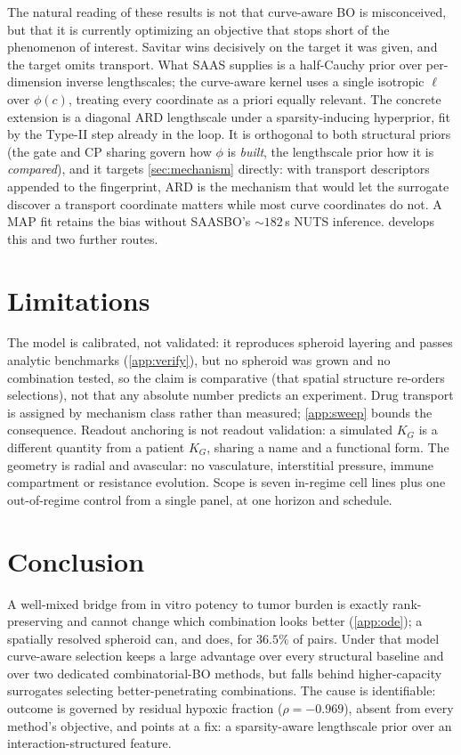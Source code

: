 \documentclass{article}
\begin{document}
The natural reading of these results is not that curve-aware BO is
misconceived, but that it is currently optimizing an objective that stops
short of the phenomenon of interest. Savitar wins decisively on the target it was given, and the target omits transport. What SAAS supplies is a
half-Cauchy prior over per-dimension inverse lengthscales; the curve-aware
kernel uses a single isotropic $\ell$ over $\phi(c)$, treating every
coordinate as a priori equally relevant. The concrete extension is a diagonal
ARD lengthscale under a sparsity-inducing hyperprior, fit by the Type-II step
already in the loop. It is orthogonal to both structural priors (the gate and CP sharing govern how $\phi$ is \emph{built}, the lengthscale prior how it is \emph{compared}), and it targets \cref{sec:mechanism} directly: with transport descriptors appended to the fingerprint, ARD is the mechanism that would let the surrogate discover a transport coordinate matters while most curve coordinates do not. A MAP fit retains the bias without SAASBO's
${\sim}182$\,s NUTS inference.  develops this and two
further routes.

\section{Limitations}
\label{sec:limits}

The model is calibrated, not validated: it reproduces spheroid layering and
passes analytic benchmarks (\cref{app:verify}), but no spheroid was grown and
no combination tested, so the claim is comparative (that spatial structure
re-orders selections), not that any absolute number predicts an experiment.
Drug transport is assigned by mechanism class rather than measured;
\cref{app:sweep} bounds the consequence. Readout anchoring is not readout
validation: a simulated $K_G$ is a different quantity from a patient $K_G$,
sharing a name and a functional form. The geometry is radial and avascular: no vasculature, interstitial pressure, immune compartment or resistance evolution. Scope is seven in-regime cell lines plus one
out-of-regime control from a single panel, at one horizon and schedule.

\section{Conclusion}

A well-mixed bridge from in vitro potency to tumor burden is exactly
rank-preserving and cannot change which combination looks better
(\cref{app:ode}); a spatially resolved spheroid can, and does, for $36.5\%$
of pairs. Under that model curve-aware selection keeps a large advantage over
every structural baseline and over two dedicated combinatorial-BO methods,
but falls behind higher-capacity surrogates selecting better-penetrating
combinations. The cause is identifiable: outcome is governed by residual
hypoxic fraction ($\rho = -0.969$), absent from every method's
objective, and points at a fix: a sparsity-aware lengthscale prior over an
interaction-structured feature.
\end{document}
